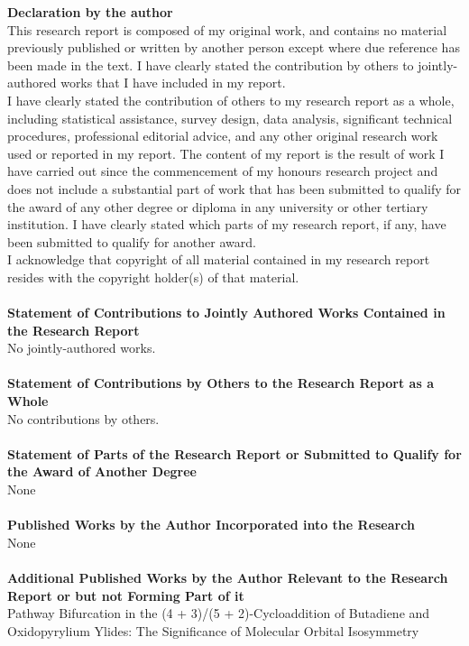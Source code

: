 \documentclass[a4paper, 12pt, openany]{book}
\begin{document}
\begin{footnotesize}
\noindent
\textbf{Declaration by the author}\\
This	research	report	is	composed	of	my	original	work,	and	contains	no	material	previously	published	or	written	by	another	person	except	where	due	reference	has	been	made in	the	text. I	have clearly	stated the	contribution by	others	to jointly-authored works that I have included in	my	report.\\
\indent I have clearly	stated the	contribution of	others	to	my	research report	as	a	whole, including statistical	assistance,	survey	design,	data analysis,	significant	technical	procedures,	professional editorial advice,	and	any other original research work used	or reported in	my	report.	The	content	of	my	report	is	the	result	of	work I	have carried	out	since the	
commencement of	my	honours	research project	and	does not	include	a	substantial	part	of work that has	been submitted to qualify	for	the	award	of	any	other degree	or	diploma	in	any	university or other tertiary institution. I have clearly	stated	which parts of my	research report,	if any, have	been	submitted	to	qualify	for	another	award.\\
\indent I	acknowledge	that	copyright	of	all	material	contained	in	my	research report	resides	with the	copyright	holder(s)	of	that	material.
\\
\\
\textbf{Statement	of	Contributions	to	Jointly	Authored Works	Contained	in	the	Research	Report}
\\
No jointly-authored	works.
\\
\\
\textbf{Statement	of	Contributions	by	Others	to	the	Research	Report	as	a	Whole}
\\
No	contributions	by	others.	
\\
\\
\textbf{Statement of Parts of the Research Report or Submitted to Qualify for the Award of Another Degree}
\\
None
\\
\\
\textbf{Published	Works	by	the	Author	Incorporated	into	the	Research}\\
None
\\
\\
\textbf{Additional	Published	Works	by	the	Author	Relevant to	the	Research Report	or	but	not	Forming Part of it}\\	
Pathway Bifurcation in the (4 + 3)/(5 + 2)-Cycloaddition of Butadiene and Oxidopyrylium Ylides: The Significance of Molecular Orbital Isosymmetry

\end{footnotesize}
\end{document}
